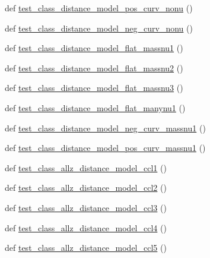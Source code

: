 \begin{DoxyCompactItemize}
\item 
def \mbox{\hyperlink{namespaceccl__test__distances_af7fbdf204412814265e8ac3abdae6d0f}{test\+\_\+class\+\_\+distance\+\_\+model\+\_\+pos\+\_\+curv\+\_\+nonu}} ()
\item 
def \mbox{\hyperlink{namespaceccl__test__distances_a91ae54e6c009701a7847fb4ecc665899}{test\+\_\+class\+\_\+distance\+\_\+model\+\_\+neg\+\_\+curv\+\_\+nonu}} ()
\item 
def \mbox{\hyperlink{namespaceccl__test__distances_aa09eee77252256aad13d6185a05f38d0}{test\+\_\+class\+\_\+distance\+\_\+model\+\_\+flat\+\_\+massnu1}} ()
\item 
def \mbox{\hyperlink{namespaceccl__test__distances_aad241e28f1ff0f6b9db29241f718c89b}{test\+\_\+class\+\_\+distance\+\_\+model\+\_\+flat\+\_\+massnu2}} ()
\item 
def \mbox{\hyperlink{namespaceccl__test__distances_ac0bed567e36c1bf721a6dfe8451359bc}{test\+\_\+class\+\_\+distance\+\_\+model\+\_\+flat\+\_\+massnu3}} ()
\item 
def \mbox{\hyperlink{namespaceccl__test__distances_adf9d1401bd6aac83c599ba6e715e7e5b}{test\+\_\+class\+\_\+distance\+\_\+model\+\_\+flat\+\_\+manynu1}} ()
\item 
def \mbox{\hyperlink{namespaceccl__test__distances_a09a9eb8c340690a269c36ca93ac1bf6f}{test\+\_\+class\+\_\+distance\+\_\+model\+\_\+neg\+\_\+curv\+\_\+massnu1}} ()
\item 
def \mbox{\hyperlink{namespaceccl__test__distances_afa81910489eef8da3b548da81dc23846}{test\+\_\+class\+\_\+distance\+\_\+model\+\_\+pos\+\_\+curv\+\_\+massnu1}} ()
\item 
def \mbox{\hyperlink{namespaceccl__test__distances_a419f62a40098f2bbccbf6c5efe53dc8f}{test\+\_\+class\+\_\+allz\+\_\+distance\+\_\+model\+\_\+ccl1}} ()
\item 
def \mbox{\hyperlink{namespaceccl__test__distances_aa0d96d2b6608404242923827502a6dbd}{test\+\_\+class\+\_\+allz\+\_\+distance\+\_\+model\+\_\+ccl2}} ()
\item 
def \mbox{\hyperlink{namespaceccl__test__distances_ae08d6a006a5dbe616062b627f6e9eb82}{test\+\_\+class\+\_\+allz\+\_\+distance\+\_\+model\+\_\+ccl3}} ()
\item 
def \mbox{\hyperlink{namespaceccl__test__distances_a8128c37e47742e3310cf02f4af3ed5a6}{test\+\_\+class\+\_\+allz\+\_\+distance\+\_\+model\+\_\+ccl4}} ()
\item 
def \mbox{\hyperlink{namespaceccl__test__distances_aee52cf26198eefd6f931a6eba0fd64f8}{test\+\_\+class\+\_\+allz\+\_\+distance\+\_\+model\+\_\+ccl5}} ()

\end{DoxyCompactItemize}
